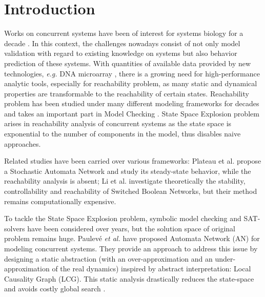 \documentclass[runningheads]{llncs}
\begin{document}
\section{Introduction}
\label{intro}
Works on concurrent systems have been of interest for systems biology for a decade \cite{bockmayr2002using,bortolussi2008modeling,wiley2003computational}. 
In this context, the challenges nowadays consist of not only model validation with regard to existing knowledge on systems but also behavior prediction of these systems. 
With quantities of available data provided by new technologies, \textit{e.g.} DNA microarray \cite{marx2013}, there is a growing need for high-performance analytic tools, especially for reachability problem, as many static and dynamical properties are transformable to the reachability of certain states. Reachability problem has been studied under many different modeling frameworks for decades \cite{akutsu2007control,barrett2006complexity,Daws1998,esparza1998,mayr1984,wozna2003} and takes an important part in Model Checking \cite{clarke20142}. 
State Space Explosion problem arises in reachability analysis of concurrent systems as the state space is exponential to the number of components in the model, thus disables naive approaches. 

Related studies have been carried over various frameworks: Plateau et al. \cite{plateau1991stochastic} propose a Stochastic Automata Network and study its steady-state behavior, while the reachability analysis is absent; Li et al. \cite{li2012reachability,li2014stability} investigate theoretically the stability, controllability and reachability of Switched Boolean Networks, but their method remains computationally expensive.  

To tackle the State Space Explosion problem, symbolic model checking \cite{burch1992symbolic} and SAT-solvers \cite{abdulla2000symbolic} have been considered over years, but the solution space of original problem remains huge. Paulev\'e \textit{et al.} \cite{folschette2015,pauleve2011} have proposed Automata Network (AN) for modeling concurrent systems. 
They provide an approach to address this issue by designing a static abstraction (with an over-approximation and an under-approximation of the real dynamics) inspired by abstract interpretation: Local Causality Graph (LCG). 
This static analysis drastically reduces the state-space and avoids costly global search \cite{pauleve2012}.
\end{document}
